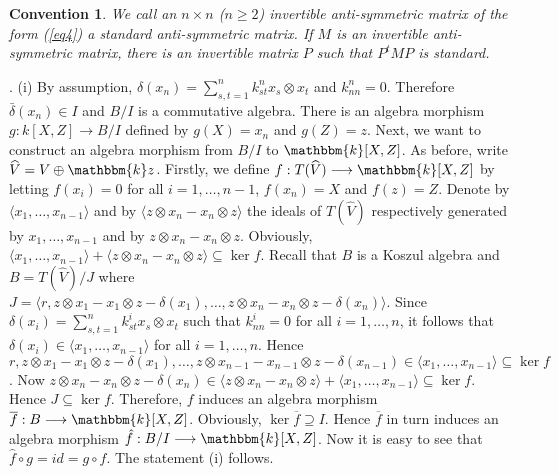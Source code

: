 \documentclass[a4paper]{amsart}
\newtheorem{con}[thm]{Convention}
\begin{document}
\begin{con}\label{con} {\rm We call an $n\times n$ ($n\ge2$) invertible anti-symmetric matrix of the form (\ref{eq4}) a {\it standard anti-symmetric matrix}. If $M$ is an invertible anti-symmetric matrix, there is an invertible matrix $P$ such that $P^tMP$ is standard.}
\end{con}

. (i) By assumption, $\delta(x_n)=\sum_{s,t=1}^nk^n_{st}x_s{\otimes} x_t$ and $k^n_{nn}=0$. Therefore $\bar{\delta}(x_n)\in I$ and $B/I$ is a commutative algebra.
There is an algebra morphism $g:k[X,Z]\longrightarrow B/I$ defined by $g(X)=x_n$ and $g(Z)=z$. Next, we want to construct an algebra morphism from $B/I$ to ${\mathbbm{k}}[X,Z]$. As before, write $\widehat{V}=V\oplus{\mathbbm{k}} z$. Firstly, we define $f:T(\widehat{V})\longrightarrow {\mathbbm{k}}[X,Z]$ by letting $f(x_i)=0$ for all $i=1,\dots,n-1$, $f(x_n)=X$ and $f(z)=Z$. Denote by $\langle x_1,\dots,x_{n-1}\rangle$ and by $\langle z{\otimes} x_n-x_n{\otimes} z\rangle$  the ideals of $T(\widehat{V})$ respectively generated by $x_1,\dots,x_{n-1}$  and  by $z{\otimes} x_n-x_n{\otimes} z$. Obviously, $\langle x_1,\dots,x_{n-1}\rangle+\langle z{\otimes} x_n-x_n{\otimes} z\rangle\subseteq\ker f$. Recall that $B$ is a Koszul algebra and $B=T(\widehat{V})/J$ where $J=\langle r,z{\otimes} x_1-x_1{\otimes} z-\delta(x_1),\dots,z{\otimes} x_n-x_n{\otimes} z-\delta(x_n)\rangle$. Since $\delta(x_i)=\sum_{s,t=1}^nk^i_{st}x_s{\otimes} x_t$ such that $k^i_{nn}=0$ for all $i=1,\dots,n$, it follows that $\delta(x_i)\in\langle x_1,\dots,x_{n-1}\rangle$ for all $i=1,\dots,n$. Hence $r,z{\otimes} x_1-x_1{\otimes} z-\delta(x_1),\dots,z{\otimes} x_{n-1}-x_{n-1}{\otimes} z-\delta(x_{n-1})\in \langle x_1,\dots,x_{n-1}\rangle\subseteq\ker f$. Now $z{\otimes} x_n-x_n{\otimes} z-\delta(x_n)\in \langle z{\otimes} x_n-x_n{\otimes} z\rangle+\langle x_1,\dots,x_{n-1}\rangle\subseteq\ker f$. Hence $J\subseteq\ker f$. Therefore, $f$ induces an algebra morphism $\overline{f}:B\longrightarrow {\mathbbm{k}}[X,Z]$. Obviously, $\ker\overline{f}\supseteq I$. Hence $\overline{f}$ in turn induces an algebra morphism $\hat{f}:B/I\longrightarrow {\mathbbm{k}}[X,Z]$. Now it is easy to see that $\hat{f}\circ g=id=g\circ\hat{f}$. The statement (i) follows.
\end{document}
